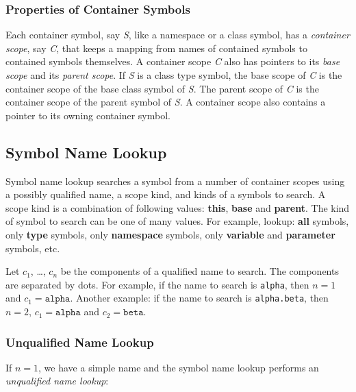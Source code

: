 \documentclass[a4paper,oneside,11pt]{book}
\theoremstyle{definition}
\begin{document}
\subsubsection{Properties of Container Symbols}

Each container symbol, say \emph{S}, like a namespace or a class symbol, has a \emph{container scope}, say \emph{C}, that
keeps a mapping from names of contained symbols to contained symbols themselves.
A container scope \emph{C} also has pointers to its \emph{base scope} and its \emph{parent scope}.
If \emph{S} is a class type symbol, the base scope of \emph{C} is the container scope of the base class symbol of \emph{S}.
The parent scope of \emph{C} is the container scope of the parent symbol of \emph{S}.
A container scope also contains a pointer to its owning container symbol.

\subsection{Symbol Name Lookup}\label{namelookup}

Symbol name lookup searches a symbol from a number of container scopes using a possibly qualified name,
a scope kind, and kinds of a symbols to search.
A scope kind is a combination of following values: \textbf{this}, \textbf{base} and \textbf{parent}.
The kind of symbol to search can be one of many values.
For example, lookup: \textbf{all} symbols, only \textbf{type} symbols, only \textbf{namespace} symbols, only \textbf{variable} and \textbf{parameter} symbols, etc.

Let $c_1$, \ldots, $c_n$ be the components of a qualified name to search. The components are separated by dots.
For example, if the name to search is \texttt{alpha}, then $n = 1$ and $c_1 = \texttt{alpha}$.
Another example: if the name to search is \texttt{alpha.beta}, then $n = 2$, $c_1 = \texttt{alpha}$ and $c_2 = \texttt{beta}$.

\subsubsection{Unqualified Name Lookup}

If $n = 1$, we have a simple name and the symbol name lookup performs an \emph{unqualified name lookup}:
\end{document}
